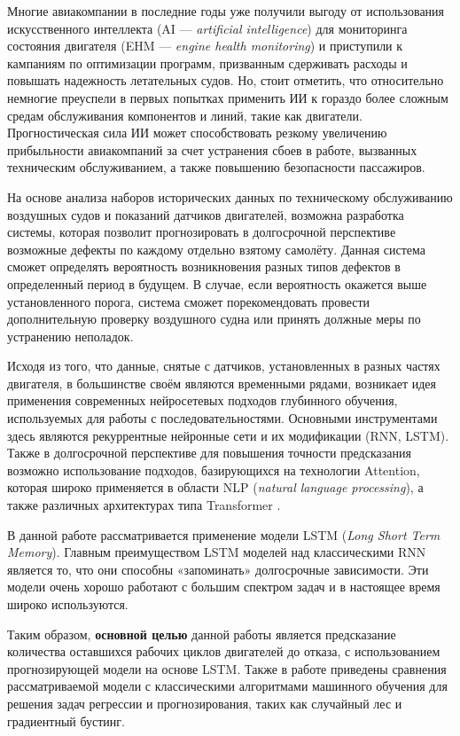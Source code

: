 \documentclass[14pt]{extarticle}
\begin{document}
Многие авиакомпании в последние годы уже получили выгоду от использования искусственного интеллекта (AI --- {\it artificial intelligence}) для мониторинга состояния двигателя (EHM --- {\it engine health monitoring}) и приступили к кампаниям по оптимизации программ, призванным сдерживать расходы и повышать надежность летательных судов. Но, стоит отметить, что относительно немногие преуспели в первых попытках применить ИИ к гораздо более сложным средам обслуживания компонентов и линий, такие как двигатели. Прогностическая сила ИИ может способствовать резкому увеличению прибыльности авиакомпаний за счет устранения сбоев в работе, вызванных техническим обслуживанием, а также повышению безопасности пассажиров.

На основе анализа наборов исторических данных по техническому обслуживанию воздушных судов и показаний датчиков двигателей, возможна разработка системы, которая позволит прогнозировать в долгосрочной перспективе возможные дефекты по каждому отдельно взятому самолёту. Данная система сможет определять вероятность возникновения разных типов дефектов в определенный период в будущем. В случае, если вероятность окажется выше установленного порога, система сможет порекомендовать провести дополнительную проверку воздушного судна или принять должные меры по устранению неполадок.

Исходя из того, что данные, снятые с датчиков, установленных в разных частях двигателя, в большинстве своём являются временными рядами, возникает идея применения современных нейросетевых подходов глубинного обучения, используемых для работы с последовательностями. Основными инструментами здесь являются рекуррентные нейронные сети и их модификации (RNN, LSTM). Также в долгосрочной перспективе для повышения точности предсказания возможно использование подходов, базирующихся на технологии Attention, которая широко применяется в области NLP ({\it natural language processing}), а также различных архитектурах типа Transformer \cite{46201}.

В данной работе рассматривается применение модели LSTM ({\it Long Short Term Memory}). Главным преимуществом LSTM моделей над классическими RNN является то, что они способны «запоминать» долгосрочные зависимости. Эти модели очень хорошо работают с большим спектром задач и в настоящее время широко используются.

Таким образом, {\bf основной целью} данной работы является предсказание количества оставшихся рабочих циклов двигателей до отказа, с использованием прогнозирующей модели на основе LSTM. Также в работе приведены сравнения рассматриваемой модели с классическими алгоритмами машинного обучения для решения задач регрессии и прогнозирования, таких как случайный лес и градиентный бустинг. 
\end{document}
